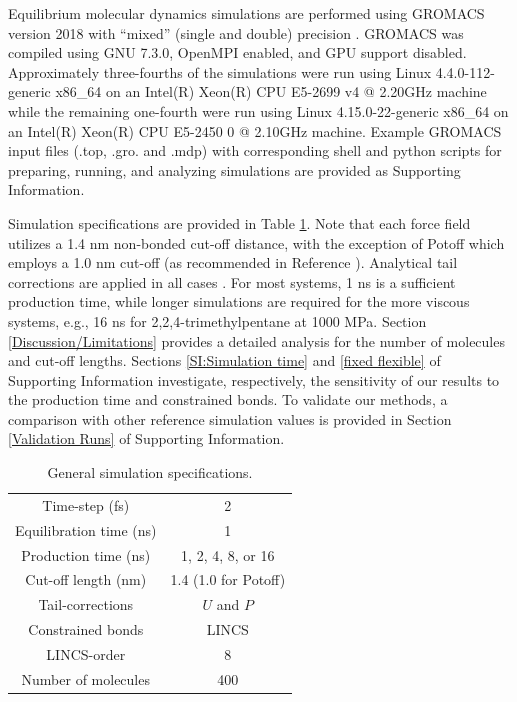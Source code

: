 \documentclass[preprint,review,12pt]{elsarticle}
\begin{document}
	Equilibrium molecular dynamics simulations are performed using GROMACS version 2018 with ``mixed'' (single and double) precision \cite{GROMACS_2018}. GROMACS was compiled using GNU 7.3.0, OpenMPI enabled, and GPU support disabled. Approximately three-fourths of the simulations were run using Linux 4.4.0-112-generic x86\_64 on an Intel(R) Xeon(R) CPU E5-2699 v4 @ 2.20GHz machine while the remaining one-fourth were run using Linux 4.15.0-22-generic x86\_64 on an Intel(R) Xeon(R) CPU E5-2450 0 @ 2.10GHz machine. Example GROMACS input files (.top, .gro. and .mdp) with corresponding shell and python scripts for preparing, running, and analyzing simulations are provided as Supporting Information. 
	
	
	Simulation specifications are provided in Table \ref{tab:sim_specs}. Note that each force field utilizes a 1.4 nm non-bonded cut-off distance, with the exception of Potoff which employs a 1.0 nm cut-off (as recommended in Reference ). Analytical tail corrections are applied in all cases \cite{GROMACS_note}. For most systems, 1 ns is a sufficient production time, while longer simulations are required for the more viscous systems, e.g., 16 ns for 2,2,4-trimethylpentane at 1000 MPa. Section \ref{Discussion/Limitations} provides a detailed analysis for the number of molecules and cut-off lengths. Sections \ref{SI:Simulation time} and \ref{fixed flexible} of Supporting Information investigate, respectively, the sensitivity of our results to the production time and constrained bonds. To validate our methods, a comparison with other reference simulation values \cite{NIST_SRSW,Kioupis2000,Nieto2006} is provided in Section \ref{Validation Runs} of Supporting Information. 

	 
	\begin{table}[htb!]
		\caption{General simulation specifications.} \label{tab:sim_specs}
		\begin{center}
			\begin{tabular}{|c|c|}
				\hline
				Time-step (fs) & 2 \\
				Equilibration time (ns) & 1 \\
				Production time (ns) & 1, 2, 4, 8, or 16 \\
				Cut-off length (nm) & 1.4 (1.0 for Potoff) \\
				Tail-corrections & $U$ and $P$ \\
				Constrained bonds & LINCS \cite{Hess1998,Hess2008} \\
				LINCS-order & 8 \\			     
				Number of molecules & 400 \\
				\hline        
			\end{tabular}
		\end{center}
	\end{table}
	
\end{document}
